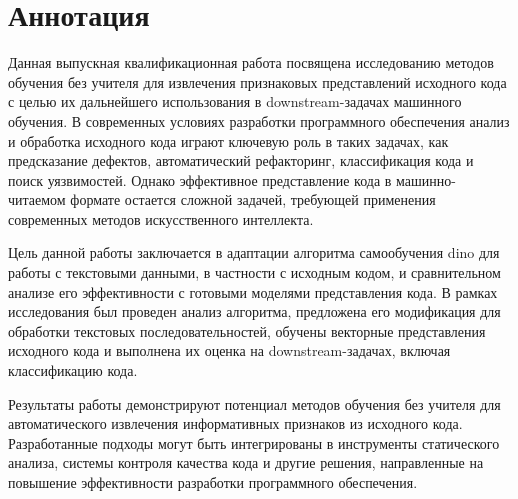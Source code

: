 \documentclass[../document.tex]{subfiles}
\begin{document}
    \section*{Аннотация}
    \par Данная выпускная квалификационная работа посвящена исследованию методов обучения без учителя для извлечения признаковых представлений исходного кода с целью их дальнейшего использования в downstream-задачах машинного обучения. В современных условиях разработки программного обеспечения анализ и обработка исходного кода играют ключевую роль в таких задачах, как предсказание дефектов, автоматический рефакторинг, классификация кода и поиск уязвимостей. Однако эффективное представление кода в машинно-читаемом формате остается сложной задачей, требующей применения современных методов искусственного интеллекта.
    \par Цель данной работы заключается в адаптации алгоритма самообучения \gls{dino} для работы с текстовыми данными, в частности с исходным кодом, и сравнительном анализе его эффективности с готовыми моделями представления кода. В рамках исследования был проведен анализ алгоритма, предложена его модификация для обработки текстовых последовательностей, обучены векторные представления исходного кода и выполнена их оценка на downstream-задачах, включая классификацию кода.
    \par Результаты работы демонстрируют потенциал методов обучения без учителя для автоматического извлечения информативных признаков из исходного кода. Разработанные подходы могут быть интегрированы в инструменты статического анализа, системы контроля качества кода и другие решения, направленные на повышение эффективности разработки программного обеспечения.
\end{document}
